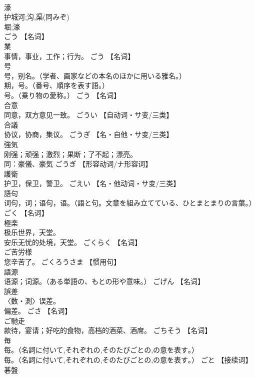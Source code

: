 \documentclass[8pt]{extreport}
\begin{document}
\begin{CJK}{UTF8}{min}
\\	濠	
\\	护城河;沟,渠(同みぞ) 
\\	堀;濠 
\\	ごう		【名词】
\\	業	
\\	事情，事业，工作；行为。	ごう		【名词】
\\	号	
\\	号，别名。（学者、画家などの本名のほかに用いる雅名。） 
\\	期，号。（番号、順序を表す語。） 
\\	号。（乗り物の愛称。）	ごう		【名词】
\\	合意	
\\	同意，双方意见一致。	ごうい		【自动词・サ变/三类】
\\	合議	
\\	协议，协商，集议。	ごうぎ		【名・自他・サ变/三类】
\\	強気	
\\	刚强；顽强；激烈；果断；了不起；漂亮。 
\\	同：豪儀、豪気	ごうぎ		【形容动词/ナ形容词】
\\	護衛	
\\	护卫，保卫，警卫。	ごえい		【名・他动词・サ变/三类】
\\	語句	
\\	词句，词；语句，语。（語と句。文章を組み立てている、ひとまとまりの言葉。）	ごく		【名词】
\\	極楽	
\\	极乐世界，天堂。 
\\	安乐无忧的处境，天堂。	ごくらく		【名词】
\\	ご苦労様	
\\	您辛苦了。	ごくろうさま		【惯用句】
\\	語源	
\\	语源；词源。（ある単語の、もとの形や意味。）	ごげん		【名词】
\\	誤差	
\\	〈数・測〉误差。 
\\	偏差。	ごさ		【名词】
\\	ご馳走	
\\	款待，宴请；好吃的食物，高档的酒菜、酒席。	ごちそう		【名词】
\\	毎	
\\	每。（名詞に付いて,それぞれの,そのたびごとの,の意を表す｡） 
\\	每。（名詞に付いて,それぞれの,そのたびごとの,の意を表す｡）	ごと		【接续词】
\\	碁盤	

\end{CJK}
\end{document}
